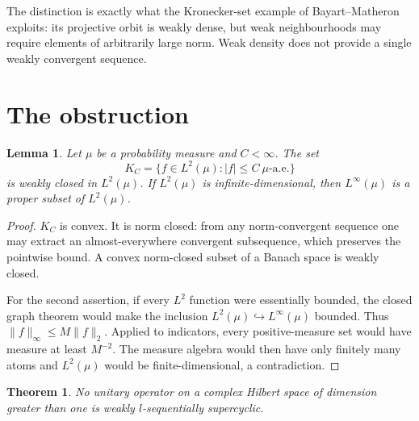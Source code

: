 \documentclass[10pt]{article}
\newtheorem{theorem}{Theorem}
\newtheorem{lemma}{Lemma}
\begin{document}
The distinction is exactly what the Kronecker-set example of
Bayart--Matheron exploits: its projective orbit is weakly dense, but weak
neighbourhoods may require elements of arbitrarily large norm.  Weak density
does not provide a single weakly convergent sequence.

\section{The obstruction}
\begin{lemma}\label{lem:linfty}
Let $\mu$ be a probability measure and $C<\infty$.  The set
\[
 K_C=\{f\in L^2(\mu): |f|\le C\ \mu\text{-a.e.}\}
\]
is weakly closed in $L^2(\mu)$.  If $L^2(\mu)$ is infinite-dimensional, then
$L^\infty(\mu)$ is a proper subset of $L^2(\mu)$.
\end{lemma}

\begin{proof}
$K_C$ is convex.  It is norm closed: from any norm-convergent sequence one
may extract an almost-everywhere convergent subsequence, which preserves the
pointwise bound.  A convex norm-closed subset of a Banach space is weakly
closed.

For the second assertion, if every $L^2$ function were essentially bounded,
the closed graph theorem would make the inclusion
$L^2(\mu)\hookrightarrow L^\infty(\mu)$ bounded.  Thus
$\|f\|_\infty\le M\|f\|_2$.  Applied to indicators, every positive-measure
set would have measure at least $M^{-2}$.  The measure algebra would then
have only finitely many atoms and $L^2(\mu)$ would be finite-dimensional, a
contradiction.
\end{proof}

\begin{theorem}\label{thm:unitary}
No unitary operator on a complex Hilbert space of dimension greater than one
is weakly $l$-sequentially supercyclic.
\end{theorem}
\end{document}
